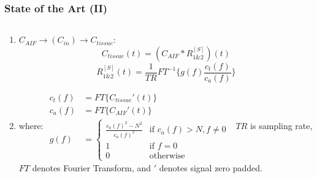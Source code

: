 %
% 

\begin{frame}
  \frametitle{State of the Art (II)}
  \cite{strakaRealTimeDiffusion2010}
    \begin{columns}
    \begin{column}{0.45\textwidth}                 %
    {\small
    \begin{enumerate}
        \item $C_{AIF} \rightarrow (C_{in}) \rightarrow C_{tissue}$:
        \begin{equation}
            C_{tissue}(t) = \left( C_{AIF} * R_{1\&2}^{[S]} \right)(t)
        \end{equation}
        \begin{equation}
            R_{1\&2}^{[S]}(t) = \frac{1}{TR}FT^{-1}\{g(f)\frac{c_t(f)}{c_a(f)}\}
        \end{equation}
        
        \item[] where:
        $\begin{aligned}
            c_t(f) &= FT\{C_{tissue}'(t)\} \\
            c_a(f) &= FT\{C_{AIF}'(t)\} \\
            g(f) &= {\left\{
            \begin{array}{lll}
            \frac{c_a(f)^2-N^2}{c_a(f)^2} & \text{if } c_a(f)>N, f\neq0 \\
            1 & \text{if } f=0 \\
            0 & \text{otherwise}
            \end{array}
            \right.}
        \end{aligned}$  
         {\tiny $TR$ is sampling rate, $FT{}$ denotes Fourier Transform, and $'$ denotes signal zero padded.}
    \end{enumerate}
    }
    \end{column}
    
    \hspace*{4em}                                                          %
    

\end{columns}
\end{frame}
